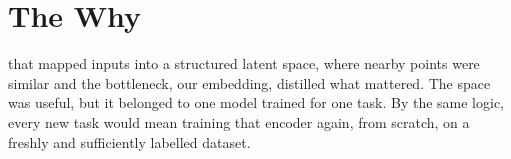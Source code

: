 %
%
%
%


\section{The Why}





 that mapped inputs into a
structured latent space, where nearby points were similar and the bottleneck, our embedding, distilled what mattered.
The space was useful, but it belonged to one model trained for one task.
By the same logic, every new task would mean training that encoder again, from scratch, on a freshly and sufficiently labelled dataset.


